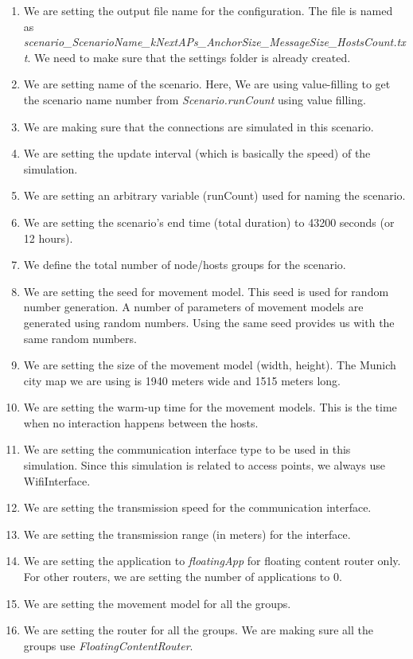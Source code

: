 \begin{enumerate}
  \item We are setting the output file name for the configuration. The file is named as \textit{scenario\_ScenarioName\_kNextAPs\_AnchorSize\_MessageSize\_HostsCount.txt}. We need to make sure that the settings folder is already created.
  \item We are setting name of the scenario. Here, We are using value-filling to get the scenario name number from \textit{Scenario.runCount} using value filling.
  \item We are making sure that the connections are simulated in this scenario.
  \item We are setting the update interval (which is basically the speed) of the simulation.
  \item We are setting an arbitrary variable (runCount) used for naming the scenario.
  \item We are setting the scenario's end time (total duration) to 43200 seconds (or 12 hours).
  \item We define the total number of node/hosts groups for the scenario.
  \item We are setting the seed for movement model. This seed is used for random number generation. A number of parameters of movement models are generated using random numbers. Using the same seed provides us with the same random numbers.
  \item We are setting the size of the movement model (width, height). The Munich city map we are using is 1940 meters wide and 1515 meters long.
  \item We are setting the warm-up time for the movement models. This is the time when no interaction happens between the hosts.
  \item We are setting the communication interface type to be used in this simulation. Since this simulation is related to access points, we always use WifiInterface.
  \item We are setting the transmission speed for the communication interface.
  \item We are setting the transmission range (in meters) for the interface.
  \item We are setting the application to \textit{floatingApp} for floating content router only. For other routers, we are setting the number of applications to 0.
  \item We are setting the movement model for all the groups.
  \item We are setting the router for all the groups. We are making sure all the groups use \textit{FloatingContentRouter}.

\end{enumerate}
